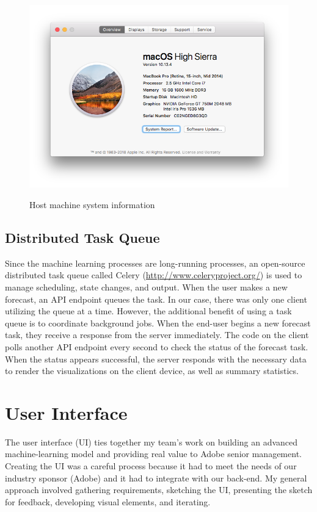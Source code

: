 \documentclass[11pt, oneside]{article}
\begin{document}
\begin{figure}[h]
  \caption{Host machine system information}
  \centering
  \includegraphics[width=12.5cm]{images/System_Specs.png}
  \label{fig:System_Specs}
\end{figure}

\subsection{Distributed Task Queue}
Since the machine learning processes are long-running processes, an open-source distributed task queue called Celery (\url{http://www.celeryproject.org/}) is used to manage scheduling, state changes, and output. When the user makes a new forecast, an API endpoint queues the task. In our case, there was only one client utilizing the queue at a time. However, the additional benefit of using a task queue is to coordinate background jobs. When the end-user begins a new forecast task, they receive a response from the server immediately. The code on the client polls another API endpoint every second to check the status of the forecast task. When the status appears successful, the server responds with the necessary data to render the visualizations on the client device, as well as summary statistics.

\section{User Interface}
\label{user_interface}
The user interface (UI) ties together my team's work on building an advanced machine-learning model and providing real value to Adobe senior management. Creating the UI was a careful process because it had to meet the needs of our industry sponsor (Adobe) and it had to integrate with our back-end. My general approach involved gathering requirements, sketching the UI, presenting the sketch for feedback, developing visual elements, and iterating.
\end{document}
